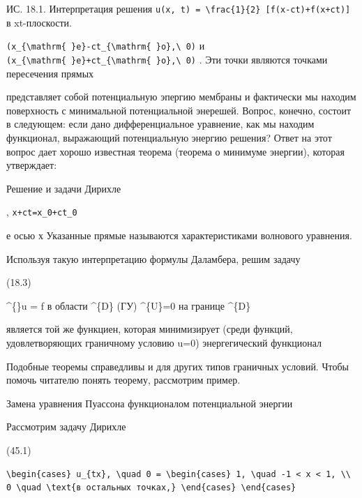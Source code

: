 \documentclass[
  ukrainian,
]{article}
\begin{document}
ИС. 18.1. Интерпретация решения
\texttt{u(x,\ t)\ =\ \textbackslash{}frac\{1\}\{2\}\ {[}f(x-ct)+f(x+ct){]}}
в xt-плоскости.

\texttt{(x\_\{\textbackslash{}mathrm\{\ \}e\}-ct\_\{\textbackslash{}mathrm\{\ \}o\},\textbackslash{}\ 0)}
и
\texttt{(x\_\{\textbackslash{}mathrm\{\ \}e\}+ct\_\{\textbackslash{}mathrm\{\ \}o\},\textbackslash{}\ 0)}
. Эти точки являются точками пересечения прямых

представляет собой потенциальную эпергию мембраны и фактически мы
находим поверхность с минимальной потенциальной энерешей. Вопрос,
конечно, состоит в следующем: если дано дифференциальное уравнение, как
мы находим функционал, выражающий потенциальную энергию решения? Ответ
на этот вопрос дает хорошо известная теорема (теорема о минимуме
энергии), которая утверждает:

Решение и задачи Дирихле

, \texttt{x+ct=x\_0+ct\_0}

е осью х Указанные прямые называются характеристиками волнового
уравнения.

Используя такую интерпретацию формулы Даламбера, решим задачу

(18.3)

\^{}\{\Lambda\}u = f в области \^{}\{D\} (ГУ) \^{}\{U\}=0 на границе
\^{}\{D\}

является той же функциен, которая минимизирует (среди функций,
удовлетворяющих граничному условию u=0) энергегический функционал

Подобные теоремы справедливы и для других типов граничных условий. Чтобы
помочь читателю понять теорему, рассмотрим пример.

Замена уравнения Пуассона функционалом потенциальной энергии

Рассмотрим задачу Дирихле

(45.1)

\begin{verbatim}
\begin{cases} u_{tx}, \quad 0 = \begin{cases} 1, \quad -1 < x < 1, \\ 0 \quad \text{в остальных точках,} \end{cases} \end{cases}
\end{verbatim}
\end{document}
